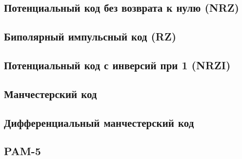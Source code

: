 \subsection{Потенциальный код без возврата к нулю (NRZ)}

\subsection{Биполярный импульсный код (RZ)}

\subsection{Потенциальный код с инверсий при 1 (NRZI)}

\subsection{Манчестерский код}

\subsection{Дифференциальный манчестерский код}

\subsection{PAM-5}

